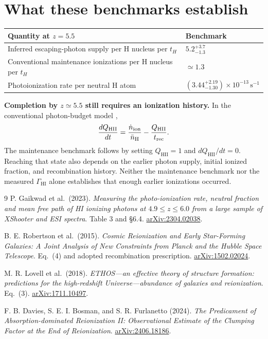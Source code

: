 \documentclass[11pt,a4paper]{article}
\newcommand{\HI}{\mathrm{HI}}
\newcommand{\HII}{\mathrm{HII}}
\begin{document}
\section*{What these benchmarks establish}
\renewcommand{\arraystretch}{1.25}
\begin{tabularx}{\textwidth}{@{}X l@{}}
\toprule
\textbf{Quantity at $z=5.5$} & \textbf{Benchmark} \\
\midrule
Inferred escaping-photon supply per H nucleus per $t_H$
& $5.2^{+3.7}_{-1.3}$ \\
Conventional maintenance ionizations per H nucleus per $t_H$
& $\simeq1.3$ \\
Photoionization rate per neutral H atom
& $(3.44^{+2.19}_{-1.30})\times10^{-13}\,\mathrm{s}^{-1}$ \\
\bottomrule
\end{tabularx}

\textbf{Completion by $z\simeq5.5$ still requires an ionization history.}
In the conventional photon-budget model \cite{Robertson2015,Davies2024},
\begin{equation}
 \frac{dQ_{\HII}}{dt}=
 \frac{\dot n_{\rm ion}}{\bar n_{\rm H}}-
 \frac{Q_{\HII}}{t_{\rm rec}}.
\end{equation}
The maintenance benchmark follows by setting $Q_{\HII}=1$ and
$dQ_{\HII}/dt=0$. Reaching that state also depends on the earlier photon
supply, initial ionized fraction, and recombination history. Neither the
maintenance benchmark nor the measured $\Gamma_{\HI}$ alone establishes
that enough earlier ionizations occurred.

\begin{thebibliography}{9}
\small
\setlength{\itemsep}{3pt}
P. Gaikwad et al.\ (2023).
\emph{Measuring the photo-ionization rate, neutral fraction and mean free
path of HI ionizing photons at $4.9\leq z\leq6.0$ from a large sample of
XShooter and ESI spectra}. Table 3 and \S6.4.
\href{https://arxiv.org/abs/2304.02038}{arXiv:2304.02038}.

B. E. Robertson et al.\ (2015).
\emph{Cosmic Reionization and Early Star-Forming Galaxies:
A Joint Analysis of New Constraints from Planck and the Hubble Space Telescope}.
Eq.\ (4) and adopted recombination prescription.
\href{https://arxiv.org/abs/1502.02024}{arXiv:1502.02024}.

M. R. Lovell et al.\ (2018).
\emph{ETHOS---an effective theory of structure formation: predictions for
the high-redshift Universe---abundance of galaxies and reionization}.
Eq.\ (3).
\href{https://arxiv.org/abs/1711.10497}{arXiv:1711.10497}.

F. B. Davies, S. E. I. Bosman, and S. R. Furlanetto (2024).
\emph{The Predicament of Absorption-dominated Reionization II:
Observational Estimate of the Clumping Factor at the End of Reionization}.
\href{https://arxiv.org/abs/2406.18186}{arXiv:2406.18186}.
\end{thebibliography}
\end{document}
